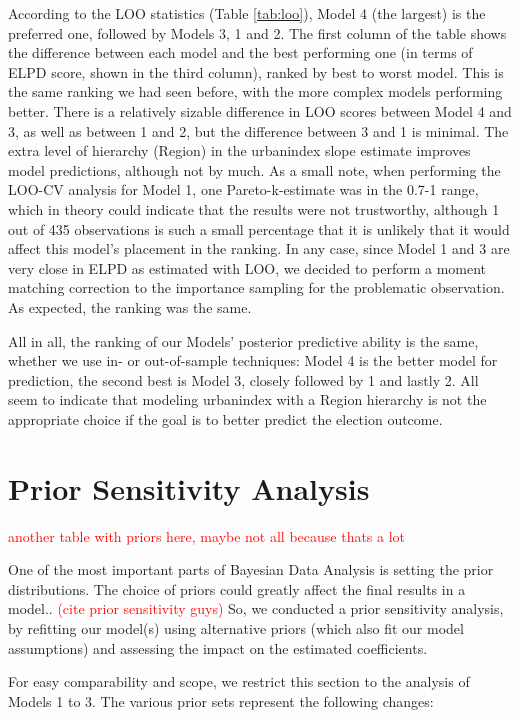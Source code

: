 \documentclass[12pt]{article}
\begin{document}
According to the LOO statistics (Table \ref{tab:loo}), Model 4 (the largest) is the preferred one, followed by Models 3, 1 and 2. The first column of the table shows the difference between each model and the best performing one (in terms of ELPD score, shown in the third column), ranked by best to worst model.
This is the same ranking we had seen before, with the more complex models performing better. There is a relatively sizable difference in LOO scores between Model 4 and 3, as well as between 1 and 2, but the difference between 3 and 1 is minimal. The extra level of hierarchy (Region) in the urbanindex slope estimate improves model predictions, although not by much.
As a small note, when performing the LOO-CV analysis for Model 1, one Pareto-k-estimate was in the 0.7-1 range, which in theory could indicate that the results were not trustworthy, although 1 out of 435 observations is such a small percentage that it is unlikely that it would affect this model's placement in the ranking. In any case, since Model 1 and 3 are very close in ELPD as estimated with LOO, we decided to perform a moment matching correction to the importance sampling for the problematic observation. As expected, the ranking was the same.


All in all, the ranking of our Models' posterior predictive ability is the same, whether we use in- or out-of-sample techniques: Model 4 is the better model for prediction, the second best is Model 3, closely followed by 1 and lastly 2. All seem to indicate that modeling urbanindex with a Region hierarchy is not the appropriate choice if the goal is to better predict the election outcome.




\section{Prior Sensitivity Analysis}

\textcolor{red}{another table with priors here, maybe not all because thats a lot}

One of the most important parts of Bayesian Data Analysis is setting the prior distributions. The choice of priors could greatly affect the final results in a model..  \textcolor{red}{(cite prior sensitivity guys)}
So, we conducted a prior sensitivity analysis, by refitting our model(s) using alternative priors (which also fit our model assumptions) and assessing the impact on the estimated coefficients.

For easy comparability and scope, we restrict this section to the analysis of Models 1 to 3. The various prior sets represent the following changes:
\end{document}
